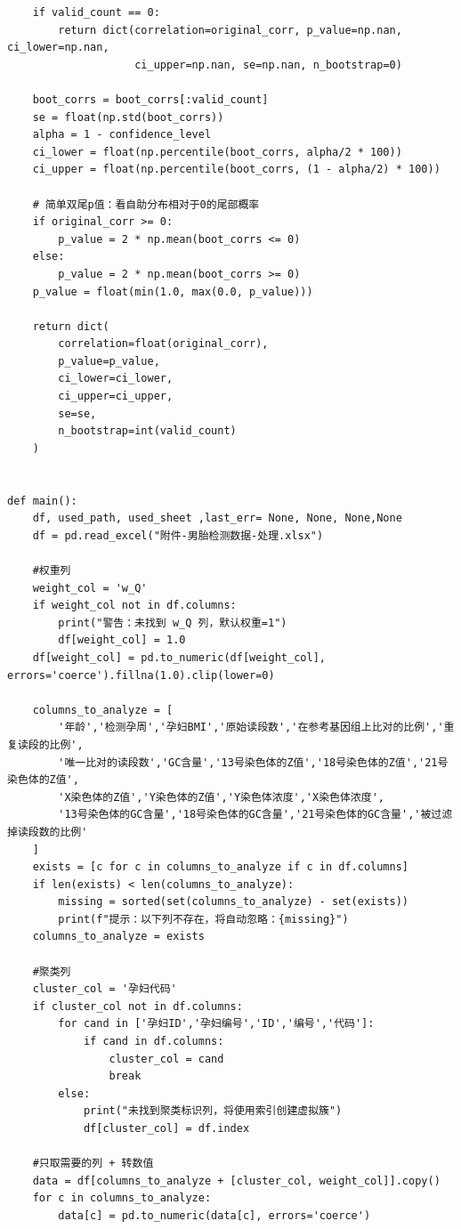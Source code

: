 \begin{lstlisting}
    if valid_count == 0:
        return dict(correlation=original_corr, p_value=np.nan, ci_lower=np.nan,
                    ci_upper=np.nan, se=np.nan, n_bootstrap=0)

    boot_corrs = boot_corrs[:valid_count]
    se = float(np.std(boot_corrs))
    alpha = 1 - confidence_level
    ci_lower = float(np.percentile(boot_corrs, alpha/2 * 100))
    ci_upper = float(np.percentile(boot_corrs, (1 - alpha/2) * 100))

    # 简单双尾p值：看自助分布相对于0的尾部概率
    if original_corr >= 0:
        p_value = 2 * np.mean(boot_corrs <= 0)
    else:
        p_value = 2 * np.mean(boot_corrs >= 0)
    p_value = float(min(1.0, max(0.0, p_value)))

    return dict(
        correlation=float(original_corr),
        p_value=p_value,
        ci_lower=ci_lower,
        ci_upper=ci_upper,
        se=se,
        n_bootstrap=int(valid_count)
    )


def main():
    df, used_path, used_sheet ,last_err= None, None, None,None
    df = pd.read_excel("附件-男胎检测数据-处理.xlsx")

    #权重列
    weight_col = 'w_Q'
    if weight_col not in df.columns:
        print("警告：未找到 w_Q 列，默认权重=1")
        df[weight_col] = 1.0
    df[weight_col] = pd.to_numeric(df[weight_col], errors='coerce').fillna(1.0).clip(lower=0)

    columns_to_analyze = [
        '年龄','检测孕周','孕妇BMI','原始读段数','在参考基因组上比对的比例','重复读段的比例',
        '唯一比对的读段数','GC含量','13号染色体的Z值','18号染色体的Z值','21号染色体的Z值',
        'X染色体的Z值','Y染色体的Z值','Y染色体浓度','X染色体浓度',
        '13号染色体的GC含量','18号染色体的GC含量','21号染色体的GC含量','被过滤掉读段数的比例'
    ]
    exists = [c for c in columns_to_analyze if c in df.columns]
    if len(exists) < len(columns_to_analyze):
        missing = sorted(set(columns_to_analyze) - set(exists))
        print(f"提示：以下列不存在，将自动忽略：{missing}")
    columns_to_analyze = exists
    
    #聚类列
    cluster_col = '孕妇代码'
    if cluster_col not in df.columns:
        for cand in ['孕妇ID','孕妇编号','ID','编号','代码']:
            if cand in df.columns:
                cluster_col = cand
                break
        else:
            print("未找到聚类标识列，将使用索引创建虚拟簇")
            df[cluster_col] = df.index

    #只取需要的列 + 转数值
    data = df[columns_to_analyze + [cluster_col, weight_col]].copy()
    for c in columns_to_analyze:
        data[c] = pd.to_numeric(data[c], errors='coerce')


\end{lstlisting}

